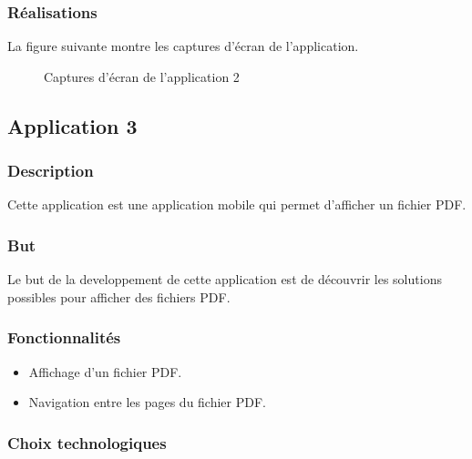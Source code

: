 \subsubsection{Réalisations}
La figure suivante montre les captures d'écran de l'application.

\begin{figure}[H]
    \centering
    \caption{Captures d'écran de l'application 2}
    \label{appendix:capture_app2}
\end{figure}

\subsection{Application 3 }

\subsubsection{Description}
Cette application est une application mobile qui permet d'afficher un fichier PDF.

\subsubsection{But}
Le but de la developpement de cette application est de découvrir les solutions possibles pour afficher des fichiers PDF.

\subsubsection{Fonctionnalités}
\begin{itemize}
    \item Affichage d'un fichier PDF.
    \item Navigation entre les pages du fichier PDF.
\end{itemize}

\subsubsection{Choix technologiques}

